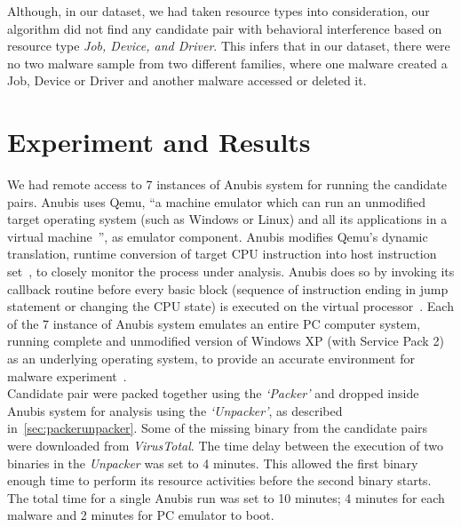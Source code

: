 Although, in our dataset, we had taken resource types {\getresourcetypes{}} into consideration, our algorithm did not find any candidate pair with behavioral interference based on resource type \emph{Job, Device, and Driver}.
This infers that in our dataset, there were no two malware sample from two different families, where one malware created a Job, Device or Driver and another malware accessed or deleted it.
\section{Experiment and Results}
\label{sec:Experiment and Results}
We had remote access to 7 instances of Anubis system for running the candidate pairs.
Anubis uses Qemu, ``a machine emulator which can run an unmodified target operating system (such as Windows or Linux) and all its applications in a virtual machine~\cite[]{qemu}'', as emulator component.
Anubis modifies Qemu's dynamic translation, runtime conversion of target CPU instruction into host instruction set~\cite[]{qemu}, to closely monitor the process under analysis.
Anubis does so by invoking its callback routine before every basic block (sequence of instruction ending in jump statement or changing the CPU state) is executed on the virtual processor~\cite[]{ttanalyze}.
Each of the 7 instance of Anubis system emulates an entire PC computer system, running complete and unmodified version of Windows XP (with Service Pack 2) as an underlying operating system, to provide an accurate environment for malware experiment~\cite[]{ttanalyze}.
\\

Candidate pair were packed together using the \emph{`Packer'} and dropped inside Anubis system for analysis using the \emph{`Unpacker'}, as described in~\ref{sec:packerunpacker}.
Some of the missing binary from the candidate pairs were downloaded from \emph{VirusTotal}.
The time delay between the execution of two binaries in the \emph{Unpacker} was set to 4 minutes.
This allowed the first binary enough time to perform its resource activities before the second binary starts.
The total time for a single Anubis run was set to 10 minutes; 4 minutes for each malware and 2 minutes for PC emulator to boot.\\

